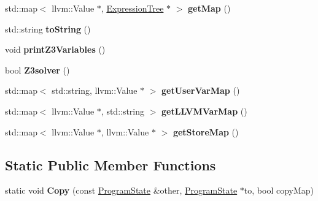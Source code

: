 \begin{DoxyCompactItemize}
\item 
std\+::map$<$ llvm\+::\+Value $\ast$, \hyperlink{classExpressionTree}{Expression\+Tree} $\ast$ $>$ {\bfseries get\+Map} ()\hypertarget{classProgramState_aad5597fd5847df79b58fa6d4bce305f4}{}\label{classProgramState_aad5597fd5847df79b58fa6d4bce305f4}

\item 
std\+::string {\bfseries to\+String} ()\hypertarget{classProgramState_a04a1d0d7f9cbaaae2d787a70e0baad9c}{}\label{classProgramState_a04a1d0d7f9cbaaae2d787a70e0baad9c}

\item 
void {\bfseries print\+Z3\+Variables} ()\hypertarget{classProgramState_ab99d94369e600e084d023bf488867fdd}{}\label{classProgramState_ab99d94369e600e084d023bf488867fdd}

\item 
bool {\bfseries Z3solver} ()\hypertarget{classProgramState_a36fc05c14c15fb95998bec15e7d3c68e}{}\label{classProgramState_a36fc05c14c15fb95998bec15e7d3c68e}

\item 
std\+::map$<$ std\+::string, llvm\+::\+Value $\ast$ $>$ {\bfseries get\+User\+Var\+Map} ()\hypertarget{classProgramState_afe98b01794d73a613e5f717caf59ab47}{}\label{classProgramState_afe98b01794d73a613e5f717caf59ab47}

\item 
std\+::map$<$ llvm\+::\+Value $\ast$, std\+::string $>$ {\bfseries get\+L\+L\+V\+M\+Var\+Map} ()\hypertarget{classProgramState_a96109551bf370d6f44534e2bc8c1bdad}{}\label{classProgramState_a96109551bf370d6f44534e2bc8c1bdad}

\item 
std\+::map$<$ llvm\+::\+Value $\ast$, llvm\+::\+Value $\ast$ $>$ {\bfseries get\+Store\+Map} ()\hypertarget{classProgramState_a571441fe6ca4cbf4345f49b3b5b31b54}{}\label{classProgramState_a571441fe6ca4cbf4345f49b3b5b31b54}

\end{DoxyCompactItemize}
\subsection*{Static Public Member Functions}
\begin{DoxyCompactItemize}
\item 
static void {\bfseries Copy} (const \hyperlink{classProgramState}{Program\+State} \&other, \hyperlink{classProgramState}{Program\+State} $\ast$to, bool copy\+Map)\hypertarget{classProgramState_a6db06239222f48916a1fa46c6ae8f169}{}\label{classProgramState_a6db06239222f48916a1fa46c6ae8f169}

\end{DoxyCompactItemize}
